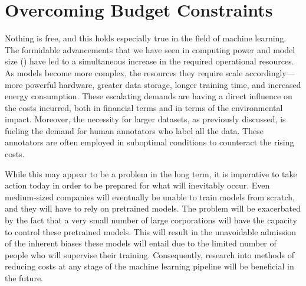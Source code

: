 \section{Overcoming Budget Constraints}
Nothing is free, and this holds especially true in the field of machine learning. The formidable advancements that we have seen in computing power and model size () have led to a simultaneous increase in the required operational resources. As models become more complex, the resources they require scale accordingly---more powerful hardware, greater data storage, longer training time, and increased energy consumption. These escalating demands are having a direct influence on the costs incurred, both in financial terms and in terms of the environmental impact. Moreover, the necessity for larger datasets, as previously discussed, is fueling the demand for human annotators who label all the data. These annotators are often employed in suboptimal conditions to counteract the rising costs.

While this may appear to be a problem in the long term, it is imperative to take action today in order to be prepared for what will inevitably occur. Even medium-sized companies will eventually be unable to train models from scratch, and they will have to rely on pretrained models. The problem will be exacerbated by the fact that a very small number of large corporations will have the capacity to control these pretrained models. This will result in the unavoidable admission of the inherent biases these models will entail due to the limited number of people who will supervise their training. Consequently, research into methods of reducing costs at any stage of the machine learning pipeline will be beneficial in the future.


